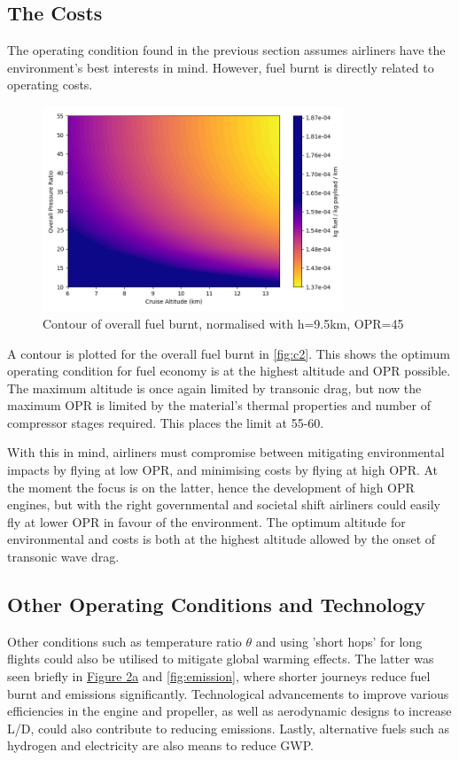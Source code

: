 \documentclass[12pt, a4paper]{article}
\begin{document}
\subsection{The Costs}
The operating condition found in the previous section assumes airliners have the environment's best interests in mind. However, fuel burnt is directly related to operating costs. 
\begin{figure}
	\centering
	\includegraphics[width=0.8\textwidth]{../Plots/contour fuel}
	\caption{Contour of overall fuel burnt, normalised with h=9.5km, OPR=45}
	\label{fig:c2}
\end{figure}
A contour is plotted for the overall fuel burnt in \autoref{fig:c2}. This shows the optimum operating condition for fuel economy is at the highest altitude and OPR possible. The maximum altitude is once again limited by transonic drag, but now the maximum OPR is limited by the material's thermal properties and number of compressor stages required. This places the limit at 55-60. 

With this in mind, airliners must compromise between mitigating environmental impacts by flying at low OPR, and minimising costs by flying at high OPR. At the moment the focus is on the latter, hence the development of high OPR engines, but with the right governmental and societal shift airliners could easily fly at lower OPR in favour of the environment. The optimum altitude for  environmental and costs is both at the highest altitude allowed by the onset of transonic wave drag. 

\subsection{Other Operating Conditions and Technology}
Other conditions such as temperature ratio $\theta$ and using 'short hops' for long flights could also be utilised to mitigate global warming effects. The latter was seen briefly in \hyperref[fig:mach]{Figure 2a} and \autoref{fig:emission}, where shorter journeys reduce fuel burnt and emissions significantly. Technological advancements to improve various efficiencies in the engine and propeller, as well as aerodynamic designs to increase L/D, could also contribute to reducing emissions. Lastly, alternative fuels such as hydrogen and electricity are also means to reduce GWP.
\end{document}
